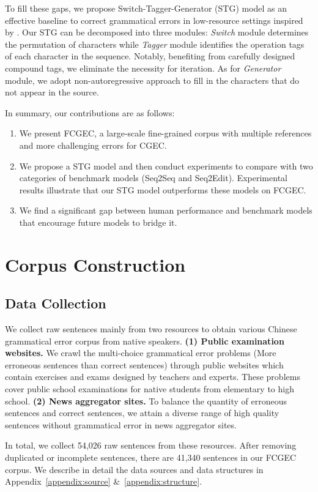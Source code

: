 \documentclass[11pt]{article}
\begin{document}
To fill these gaps, we propose Switch-Tagger-Generator (STG) model as an effective baseline to correct grammatical errors in low-resource settings inspired by \citet{mallinson2020felix}. Our STG can be decomposed into three modules: \emph{Switch} module determines the permutation of characters while \emph{Tagger} module identifies the operation tags of each character in the sequence. Notably, benefiting from carefully designed compound tags, we eliminate the necessity for iteration. As for \emph{Generator} module, we adopt non-autoregressive approach to fill in the characters that do not appear in the source. 

In summary, our contributions are as follows:
\begin{enumerate}
    \item We present FCGEC, a large-scale fine-grained corpus with multiple references and more challenging errors for CGEC.
    \item We propose a STG model and then conduct experiments to compare with two categories of benchmark models (Seq2Seq and Seq2Edit). Experimental results illustrate that our STG model outperforms these models on FCGEC.
    \item We find a significant gap between human performance and benchmark models that encourage future models to bridge it.
\end{enumerate} 
\section{Corpus Construction}

\subsection{Data Collection}

We collect raw sentences mainly from two resources to obtain various Chinese grammatical error corpus from native speakers. \textbf{(1) Public examination websites.} We crawl the multi-choice grammatical error problems (More erroneous sentences than correct sentences) through public websites which contain exercises and exams designed by teachers and experts. These problems cover public school examinations for native students from elementary to high school. \textbf{(2) News aggregator sites.} To balance the quantity of erroneous sentences and correct sentences, we attain a diverse range of high quality sentences without grammatical error in news aggregator sites.

In total, we collect 54,026 raw sentences from these resources. After removing duplicated or incomplete sentences, there are 41,340 sentences in our FCGEC corpus. We describe in detail the data sources and data structures in Appendix~\ref{appendix:source} \&~\ref{appendix:structure}.
\end{document}

